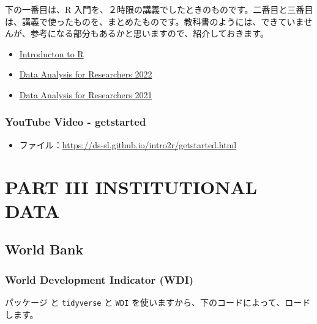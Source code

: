 \documentclass[
  xelatex, ja=standard]{bxjsbook}
\providecommand{\tightlist}{%
  \setlength{\itemsep}{0pt}\setlength{\parskip}{0pt}}
\theoremstyle{definition}
\theoremstyle{definition}
\theoremstyle{definition}
\theoremstyle{definition}
\theoremstyle{remark}
\begin{document}
下の一番目は、R 入門を、２時限の講義でしたときのものです。二番目と三番目は、講義で使ったものを、まとめたものです。教科書のようには、できていませんが、参考になる部分もあるかと思いますので、紹介しておきます。

\begin{itemize}
\tightlist
\item
  \href{https://ds-sl.github.io/intro2r/intro2r.nb.html}{Introducton to R}
\item
  \href{https://icu-hsuzuki.github.io/da4r2022/}{Data Analysis for Researchers 2022}
\item
  \href{https://icu-hsuzuki.github.io/da4r2021/}{Data Analysis for Researchers 2021}
\end{itemize}

\hypertarget{youtube-video---getstarted}{%
\section{YouTube Video - getstarted}\label{youtube-video---getstarted}}

\begin{itemize}
\tightlist
\item
  ファイル：\url{https://ds-sl.github.io/intro2r/getstarted.html}
\end{itemize}

\hypertarget{part-part-iii-institutional-data}{%
\part{PART III INSTITUTIONAL DATA}\label{part-part-iii-institutional-data}}

\hypertarget{worldbank}{%
\chapter{World Bank}\label{worldbank}}

\hypertarget{world-development-indicator-wdi}{%
\section{World Development Indicator (WDI)}\label{world-development-indicator-wdi}}

パッケージ と \texttt{tidyverse} と \texttt{WDI} を使いますから、下のコードによって、ロードします。
\end{document}
